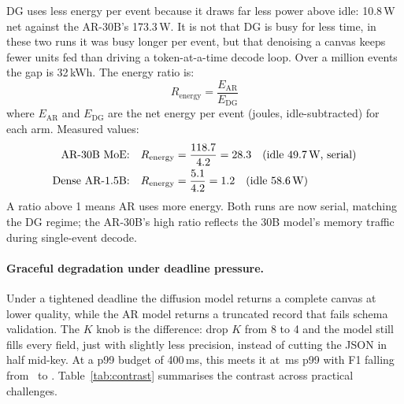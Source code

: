DG uses less energy per event because it draws far
less power above idle: 10.8\,W net against the AR-30B's 173.3\,W. It is
not that DG is busy for less time, in these two runs it was busy
longer per event, but that denoising a canvas keeps fewer units fed
than driving a token-at-a-time decode loop. Over a million events the
gap is 32\,kWh. The energy ratio is:
\begin{equation}
R_{\mathrm{energy}} = \frac{E_{\mathrm{AR}}}{E_{\mathrm{DG}}}
\end{equation}
where $E_{\mathrm{AR}}$ and $E_{\mathrm{DG}}$ are the net energy per
event (joules, idle-subtracted) for each arm. Measured values:
\begin{align}
\text{AR-30B MoE:} \quad & R_{\mathrm{energy}} =
\frac{118.7}{4.2} = 28.3 \quad \text{(idle 49.7\,W, serial)} \\
\text{Dense AR-1.5B:} \quad & R_{\mathrm{energy}} =
\frac{5.1}{4.2} = 1.2 \quad \text{(idle 58.6\,W)}
\end{align}
A ratio above 1 means AR uses more energy. Both runs are now serial,
matching the DG regime; the AR-30B's high ratio reflects the 30B
model's memory traffic during single-event decode.

\paragraph{Graceful degradation under deadline pressure.}

Under a tightened deadline the diffusion model returns a complete canvas
at lower quality, while the AR model returns a truncated record that
fails schema validation. The $K$ knob is the difference: drop $K$ from
8 to 4 and the model still fills every field, just with slightly
less precision, instead of cutting the JSON in half mid-key. At a
p99 budget of 400\,ms, this meets it at \kFourPninetynine\,ms p99 with
F1 falling from \kEightFone\ to \kFourFone. Table~\ref{tab:contrast}
summarises the contrast across practical challenges.

